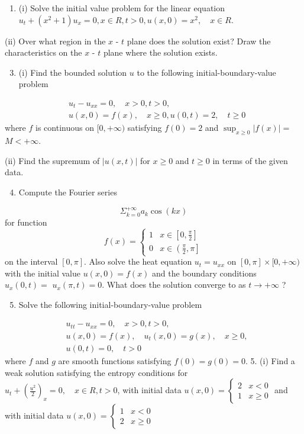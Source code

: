 \documentclass[10pt]{article}
\begin{document}
\begin{enumerate}
  \item (i) Solve the initial value problem for the linear equation $u_{t}+\left(x^{2}+1\right) u_{x}=0, x \in R, t>0, u(x, 0)=x^{2}, \quad x \in R$.
\end{enumerate}
(ii) Over what region in the $x$ - $t$ plane does the solution exist? Draw the characteristics on the $x$ - $t$ plane where the solution exists.

\begin{enumerate}
  \setcounter{enumi}{2}
  \item (i) Find the bounded solution $u$ to the following initial-boundary-value problem
\end{enumerate}
$$
\begin{aligned}
&u_{t}-u_{x x}=0, \quad x>0, t>0, \\
&u(x, 0)=f(x), \quad x \geq 0, u(0, t)=2, \quad t \geq 0
\end{aligned}
$$
where $f$ is continuous on $[0,+\infty)$ satisfying $f(0)=2$ and $\sup _{x \geq 0}|f(x)|=$ $M<+\infty$.

(ii) Find the supremum of $|u(x, t)|$ for $x \geq 0$ and $t \geq 0$ in terms of the given data.

\begin{enumerate}
  \setcounter{enumi}{3}
  \item Compute the Fourier series
\end{enumerate}
$$
\Sigma_{k=0}^{+\infty} a_{k} \cos (k x)
$$
for function
$$
f(x)= \begin{cases}1 & x \in\left[0, \frac{\pi}{2}\right] \\ 0 & x \in\left(\frac{\pi}{2}, \pi\right]\end{cases}
$$
on the interval $[0, \pi]$. Also solve the heat equation $u_{t}=u_{x x}$ on $[0, \pi] \times[0,+\infty)$ with the initial value $u(x, 0)=f(x)$ and the boundary conditions $u_{x}(0, t)=$ $u_{x}(\pi, t)=0$. What does the solution converge to as $t \rightarrow+\infty$ ?

\begin{enumerate}
  \setcounter{enumi}{4}
  \item Solve the following initial-boundary-value problem
\end{enumerate}
$$
\begin{aligned}
&u_{t t}-u_{x x}=0, \quad x>0, t>0, \\
&u(x, 0)=f(x), \quad u_{t}(x, 0)=g(x), \quad x \geq 0, \\
&u(0, t)=0, \quad t>0
\end{aligned}
$$
where $f$ and $g$ are smooth functions satisfying $f(0)=g(0)=0$. 5. (i) Find a weak solution satisfying the entropy conditions for $u_{t}+\left(\frac{u^{2}}{2}\right)_{x}=0, \quad x \in R, t>0$, with initial data $u(x, 0)= \begin{cases}2 & x<0 \\ 1 & x \geq 0\end{cases}$ and with initial data $u(x, 0)= \begin{cases}1 & x<0 \\ 2 & x \geq 0\end{cases}$
\end{document}
